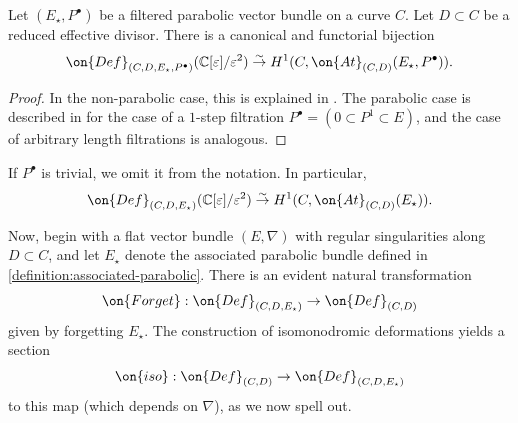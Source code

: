 \begin{proposition}
\notready\label{proposition:filtered-bundle-deformation}
    Let $(E_\star, P^\bullet)$ be a filtered parabolic vector bundle on a curve $C$. Let $D\subset C$ be a reduced effective divisor.
    There is a canonical and functorial bijection $$\on{Def}_{(C, D, E_\star,
    P^\bullet)}(\mathbb{C}[\varepsilon]/\varepsilon^2)\overset{\sim}{\to} H^1(C,
    \on{At}_{(C,D)}(E_\star,P^\bullet)).$$
\end{proposition}
\begin{proof}
	In the non-parabolic case, this is explained in \cite[\S2.2]{BHH:logarithmic}.
	The parabolic case is described in \cite[Lemma 3.2]{BHH:parabolic} for
	the case of a $1$-step filtration $P^\bullet = (0 \subset P^1 \subset
	E)$, and the case of arbitrary length filtrations is analogous.
\end{proof}
\begin{remark}
\notready
	\label{remark:}
	If $P^\bullet$ is trivial, we omit it from the notation. In particular,
	$$\on{Def}_{(C, D,
	E_\star)}(\mathbb{C}[\varepsilon]/\varepsilon^2)\overset{\sim}{\to} H^1(C,
	\on{At}_{(C,D)}(E_\star)).$$
\end{remark}

Now, begin with a flat vector bundle $(E, \nabla)$ with regular singularities
along $D \subset C$, and let $E_\star$ denote the associated parabolic bundle defined in
\autoref{definition:associated-parabolic}.
There is an evident natural transformation $$\on{Forget}: \on{Def}_{(C, D,
{E_\star})}\to \on{Def}_{(C,D)}$$ given by forgetting ${E_\star}$. The construction of
isomonodromic deformations yields a section $$\on{iso}: \on{Def}_{(C,D)}\to
\on{Def}_{(C,D,E_\star)}$$ to this map (which depends on $\nabla$), as we now spell
out.

